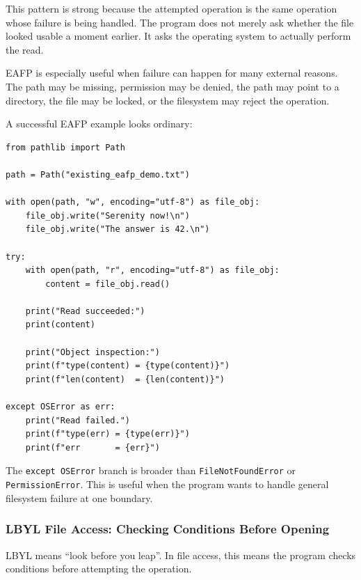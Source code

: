 This pattern is strong because the attempted operation is the same operation whose failure is being handled. The program does not merely ask whether the file looked usable a moment earlier. It asks the operating system to actually perform the read.

EAFP is especially useful when failure can happen for many external reasons. The path may be missing, permission may be denied, the path may point to a directory, the file may be locked, or the filesystem may reject the operation.

A successful EAFP example looks ordinary:

\begin{verbatim}
from pathlib import Path

path = Path("existing_eafp_demo.txt")

with open(path, "w", encoding="utf-8") as file_obj:
    file_obj.write("Serenity now!\n")
    file_obj.write("The answer is 42.\n")

try:
    with open(path, "r", encoding="utf-8") as file_obj:
        content = file_obj.read()

    print("Read succeeded:")
    print(content)

    print("Object inspection:")
    print(f"type(content) = {type(content)}")
    print(f"len(content)  = {len(content)}")

except OSError as err:
    print("Read failed.")
    print(f"type(err) = {type(err)}")
    print(f"err       = {err}")
\end{verbatim}

The \texttt{except OSError} branch is broader than \texttt{FileNotFoundError} or \texttt{PermissionError}. This is useful when the program wants to handle general filesystem failure at one boundary.

\subsubsection{LBYL File Access: Checking Conditions Before Opening}

LBYL means ``look before you leap''. In file access, this means the program checks conditions before attempting the operation.

